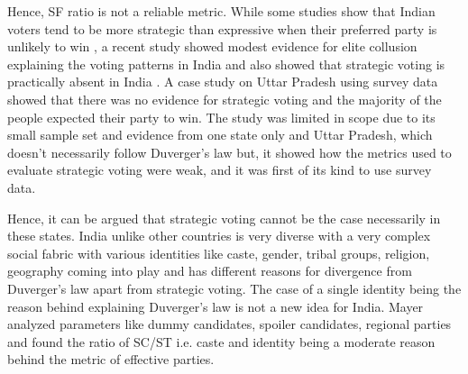 \vspace{0.3cm}

Hence, SF ratio is not a reliable metric. While some studies show that Indian voters tend to be more strategic than expressive when their preferred party is unlikely to win \citep{choi2009strategic}, a recent study showed modest evidence for elite collusion explaining the voting patterns in India and also showed that strategic voting is practically absent in India \citep{ziegfeld2021accounts}. A case study on Uttar Pradesh \citep{heath2022so} using survey data showed that there was no evidence for strategic voting and the majority of the people expected their party to win. The study was limited in scope due to its small sample set and evidence from one state only and Uttar Pradesh, which doesn't necessarily follow Duverger's law but, it showed how the metrics used to evaluate strategic voting were weak, and it was first of its kind to use survey data. 

\vspace{0.3cm}

Hence, it can be argued that strategic voting cannot be the case necessarily in these states. India unlike other countries is very diverse with a very complex social fabric with various identities like caste, gender, tribal groups, religion, geography  coming into play and has different reasons for divergence from Duverger's law apart from strategic voting. The case of a single identity being the reason behind explaining Duverger’s law is not a new idea \citep{mayer2013gross} for India. Mayer analyzed parameters like dummy candidates, spoiler candidates, regional parties  and found the ratio of SC/ST i.e. caste and identity being a moderate reason behind the metric of effective parties. 


